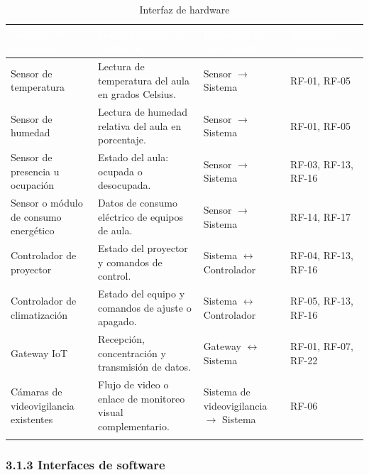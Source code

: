 \begingroup
\small
\begin{longtable}{|p{3.9cm}|p{3.9cm}|p{3.9cm}|p{3.9cm}|}
\hline
\cellcolor{sigagreen}\textcolor{white}{\textbf{Interfaz de hardware}} & \cellcolor{sigagreen}\textcolor{white}{\textbf{Datos enviados o recibidos}} & \cellcolor{sigagreen}\textcolor{white}{\textbf{Dirección del intercambio}} & \cellcolor{sigagreen}\textcolor{white}{\textbf{Requisitos relacionados}} \\ \hline
Sensor de temperatura & Lectura de temperatura del aula en grados Celsius. & Sensor $\rightarrow$ Sistema & RF-01, RF-05 \\ \hline
Sensor de humedad & Lectura de humedad relativa del aula en porcentaje. & Sensor $\rightarrow$ Sistema & RF-01, RF-05 \\ \hline
Sensor de presencia u ocupación & Estado del aula: ocupada o desocupada. & Sensor $\rightarrow$ Sistema & RF-03, RF-13, RF-16 \\ \hline
Sensor o módulo de consumo energético & Datos de consumo eléctrico de equipos de aula. & Sensor $\rightarrow$ Sistema & RF-14, RF-17 \\ \hline
Controlador de proyector & Estado del proyector y comandos de control. & Sistema $\leftrightarrow$ Controlador & RF-04, RF-13, RF-16 \\ \hline
Controlador de climatización & Estado del equipo y comandos de ajuste o apagado. & Sistema $\leftrightarrow$ Controlador & RF-05, RF-13, RF-16 \\ \hline
Gateway IoT & Recepción, concentración y transmisión de datos. & Gateway $\leftrightarrow$ Sistema & RF-01, RF-07, RF-22 \\ \hline
Cámaras de videovigilancia existentes & Flujo de video o enlace de monitoreo visual complementario. & Sistema de videovigilancia $\rightarrow$ Sistema & RF-06 \\ \hline
\caption{Interfaz de hardware}
\end{longtable}
\endgroup

\subsubsection*{3.1.3 Interfaces de software}


